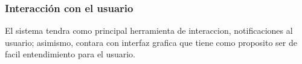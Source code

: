 \subsubsection{Interacción con el usuario}
El sistema tendra como principal herramienta de interaccion, notificaciones al usuario; asimismo, contara con interfaz grafica que tiene como proposito ser de facil entendimiento para el usuario.